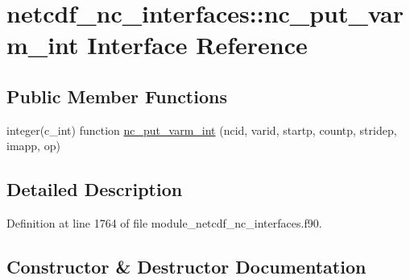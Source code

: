 \hypertarget{interfacenetcdf__nc__interfaces_1_1nc__put__varm__int}{}\section{netcdf\+\_\+nc\+\_\+interfaces\+:\+:nc\+\_\+put\+\_\+varm\+\_\+int Interface Reference}
\label{interfacenetcdf__nc__interfaces_1_1nc__put__varm__int}
\subsection*{Public Member Functions}
\begin{DoxyCompactItemize}
\item 
integer(c\+\_\+int) function \hyperlink{interfacenetcdf__nc__interfaces_1_1nc__put__varm__int_a7d23805f85784a064069be159c1c1ab7}{nc\+\_\+put\+\_\+varm\+\_\+int} (ncid, varid, startp, countp, stridep, imapp, op)
\end{DoxyCompactItemize}


\subsection{Detailed Description}


Definition at line 1764 of file module\+\_\+netcdf\+\_\+nc\+\_\+interfaces.\+f90.



\subsection{Constructor \& Destructor Documentation}
\mbox{\label{interfacenetcdf__nc__interfaces_1_1nc__put__varm__int_a7d23805f85784a064069be159c1c1ab7}} 
